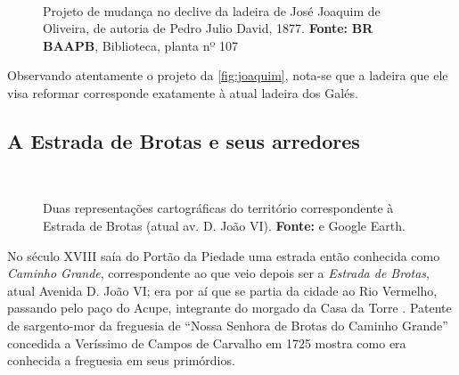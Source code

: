 \begin{figure}[!htp]
\centering
{}
\  %
\  %
\caption{Projeto de mudança no declive da ladeira de José Joaquim de Oliveira, de autoria de Pedro Julio David, 1877. \textbf{Fonte:} \textbf{BR BAAPB}, Biblioteca, planta nº 107}
\label{fig:joaquim}
\end{figure}

Observando atentamente o projeto da \autoref{fig:joaquim}, nota-se que a ladeira que ele visa reformar corresponde exatamente à atual ladeira dos Galés.

\subsection{A Estrada de Brotas e seus arredores}

\begin{figure}[!htp]
\centering
{}
\  %
\caption{Duas representações cartográficas do território correspondente à Estrada de Brotas (atual av. D. João VI). \textbf{Fonte:}  e Google Earth.}
\end{figure}

No século XVIII saía do Portão da Piedade uma estrada então conhecida como \textit{Caminho Grande}, correspondente ao que veio depois ser a \textit{Estrada de Brotas}, atual Avenida D. João VI; era por aí que se partia da cidade ao Rio Vermelho, passando pelo paço do Acupe, integrante do morgado da Casa da Torre \cite[p.~85]{campos_brotas_1942}. Patente de sargento-mor da freguesia de ``Nossa Senhora de Brotas do Caminho Grande'' concedida a Veríssimo de Campos de Carvalho em 1725 \cite[p.~114]{texmel_manusbn_1896} mostra como era conhecida a freguesia em seus primórdios.

